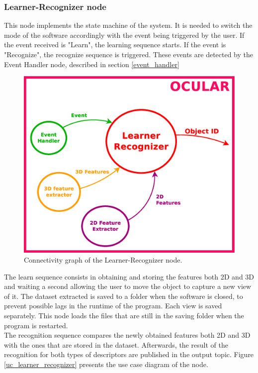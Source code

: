 
\subsubsection{Learner-Recognizer node}
\label{learner_recognizer}
	This node implements the state machine of the system. 
	It is needed to switch the mode of the software accordingly with the event being triggered by the user.  
	If the event received is "Learn", the learning sequence starts. If the event is "Recognize", the recognize sequence is triggered. 
	These events are detected by the Event Handler node, described in section \ref{event_handler}
	\\

		\begin{figure}[H]
			\begin{center}
			\includegraphics[width=0.5\linewidth]{img/diagrams/node_lr.eps}
			\caption[Learner-Recognizer node I/O]{Connectivity graph of the Learner-Recognizer node.}		
			\end{center}
						\label{node_lr}

		\end{figure}

	The learn sequence consists in obtaining and storing the features both 2D and 3D and waiting a second allowing the user to move the object to capture a new view of it. 
	The dataset extracted is saved to a folder when the software is closed, to prevent possible lags in the runtime of the program. 
	Each view is saved separately. 
	This node loads the files that are still in the saving folder when the program is restarted. 
	\\

	The recognition sequence compares the newly obtained features both 2D and 3D with the ones that are stored in the dataset. 
	Afterwards, the result of the recognition for both types of descriptors are published in the output topic. 
	Figure \ref{uc_learner_recognizer} presents the use case diagram of the node. 

